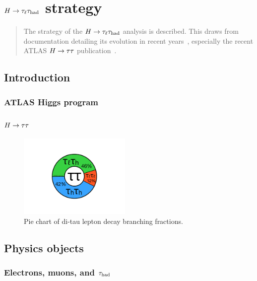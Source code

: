 \chapter[$\Htautaulh$ strategy][$\Htautaulh$ strategy]{$\Htautaulh$ strategy}
\label{chap:strategy}

\begin{quote}
  The strategy of the $\Htautaulh$ analysis is described. This draws from documentation detailing its evolution in recent years~\cite{ATLAS-CONF-2012-160,ATLAS-CONF-2013-108}, especially the recent ATLAS $H\rightarrow\tau\tau$ publication~\cite{HIGG-2013-32}.
\end{quote}

\section{Introduction}
\label{sec:strategy-introduction}

\subsection{ATLAS Higgs program}
\label{sec:strategy-higgs}

\subsection{$H\rightarrow\tau\tau$}
\label{sec:strategy-htautau}

\begin{figure}[tp]
  \centering
  \includegraphics[width=0.48\textwidth]{figures/piecharts/tautaudecay}
  \caption{Pie chart of di-tau lepton decay branching fractions.}
  \label{fig:strategy-decaypie}
\end{figure}

\section{Physics objects}
\label{sec:strategy-objects}

\subsection{Electrons, muons, and $\tau_\text{had}$}
\label{sec:strategy-leptons}

